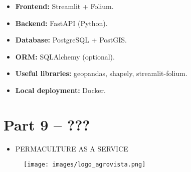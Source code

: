 \documentclass[12pt]{article}
\begin{document}
\begin{itemize}
  \item \textbf{Frontend:} Streamlit + Folium.
  \item \textbf{Backend:} FastAPI (Python).
  \item \textbf{Database:} PostgreSQL + PostGIS.
  \item \textbf{ORM:} SQLAlchemy (optional).
  \item \textbf{Useful libraries:} geopandas, shapely, streamlit-folium.
  \item \textbf{Local deployment:} Docker.
\end{itemize}

\section{Part 9 – ???}
\begin{itemize}
  \item PERMACULTURE AS A SERVICE
\end{itemize}

\begin{figure}[H]
    \centering
    \texttt{[image: images/logo\_agrovista.png]}
    \label{fig:enter-label}
\end{figure}
\end{document}
